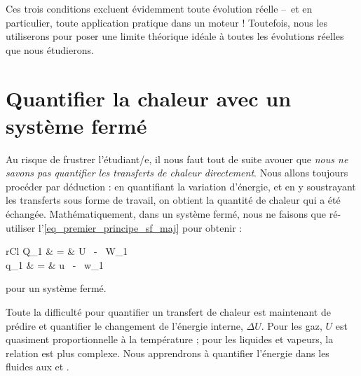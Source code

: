 		Ces trois conditions excluent évidemment toute évolution réelle --\ et en particulier, toute application pratique dans un moteur ! Toutefois, nous les utiliserons pour poser une limite théorique idéale à toutes les évolutions réelles que nous étudierons.



\section{Quantifier la chaleur avec un système fermé}

		Au risque de frustrer l’étudiant/e, il nous faut tout de suite avouer que \emph{nous ne savons pas quantifier les transferts de chaleur directement}. Nous allons toujours procéder par déduction : en quantifiant la variation d’énergie, et en y soustrayant les transferts sous forme de travail, on obtient la quantité de chaleur qui a été échangée. Mathématiquement, dans un système fermé, nous ne faisons que ré-utiliser l’\cref{eq_premier_principe_sf_maj} pour obtenir :
	\begin{IEEEeqnarray}{rCl}
		Q_{1 } 	& = & 	\Delta U \ - \  W_{1 } \\
		q_{1 } 	& = & 	\Delta u \ - \  w_{1 }
	\end{IEEEeqnarray}
	
	\begin{equationterms}
		\item pour un système fermé.
	\end{equationterms}
		
		Toute la difficulté pour quantifier un transfert de chaleur est maintenant de prédire et quantifier le changement de l’énergie interne, $\Delta U$. Pour les gaz, $U$ est quasiment proportionnelle à la température ; pour les liquides et vapeurs, la relation est plus complexe. Nous apprendrons à quantifier l’énergie dans les fluides aux \coursquatre et \courscinq.
